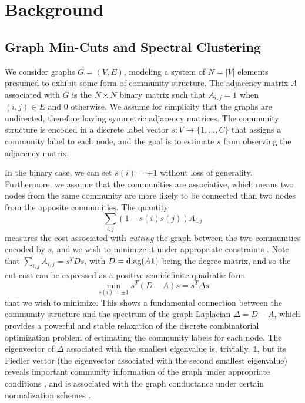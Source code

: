 \documentclass{article} \usepackage{iclr2019_conference,times}
\begin{document}
%
 \section{Background}
\label{sec:background}

\subsection{Graph Min-Cuts and Spectral Clustering}
\label{laplaciansetup}


We consider graphs $G=(V,E)$, modeling a system 
of $N=|V|$ elements presumed to exhibit some form of community structure. 
The adjacency matrix $A$ associated with $G$ is the $N \times N$ binary matrix 
such that $A_{i,j} = 1$ when $(i,j) \in E$ and $0$ otherwise. We assume for simplicity
that the graphs are undirected, therefore having symmetric adjacency matrices.
The community structure is encoded in a discrete label vector $s : V \to \{1, \dots, C\}$
that assigns a community label to each node, and the goal is to 
estimate $s$ from observing the adjacency matrix. 

In the binary case, we can set $s(i) = \pm 1$ without loss of generality. Furthermore, we assume that the communities are associative, which means two nodes from the same community are more likely to be connected than two nodes from the opposite communities. The quantity
$$\sum_{i,j} (1 - s(i) s(j)) A_{i,j} $$
measures the cost associated with \emph{cutting} the graph between the two communities encoded by $s$, and we wish to minimize it
under appropriate constraints \citep{newman2006modularity}. Note that 
$\sum_{i,j} A_{i,j} = s^T D s$, with $D = \text{diag}(A {\bf 1})$ being the degree matrix, and so the cut cost can be expressed as a positive semidefinite quadratic 
form 
$$\min_{s(i) = \pm 1} s^T (D - A) s = s^T \Delta s$$
that we wish to minimize. 
This shows a fundamental connection between the community structure 
and the spectrum of the graph Laplacian $\Delta = D - A$, 
which provides a powerful and stable relaxation of the discrete combinatorial 
optimization problem of estimating the community labels for each node.
The eigenvector of $\Delta$
associated with the smallest eigenvalue is, trivially, $\mathds{1}$, but its Fiedler 
vector (the eigenvector associated with the second smallest eigenvalue) 
reveals important community information of the graph 
under appropriate conditions \citep{newman2006modularity}, and is associated with the graph conductance 
under certain normalization schemes \citep{spielman}. 
\end{document}
